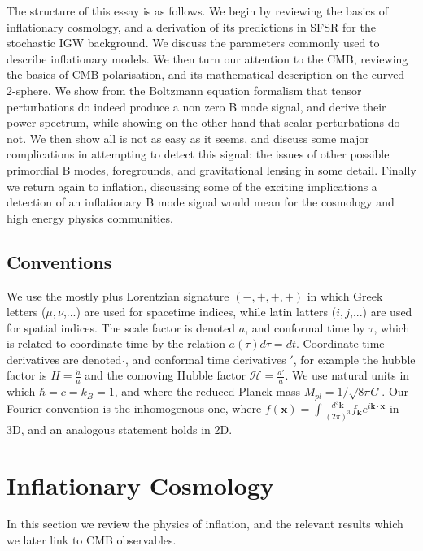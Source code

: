 \documentclass[a4paper,10pt]{article}
\renewcommand{\v}[1]{\mathbf{#1}}
\newcommand{\Mp}{M_{pl}}
\newcommand{\fint}[1]{\int \frac{d^3 \v{#1}}{(2\pi)^3}}
\begin{document}
The structure of this essay is as follows. We begin by reviewing the basics of inflationary cosmology, and a derivation of its predictions in SFSR for the stochastic IGW background. We discuss the parameters commonly used to describe inflationary models. We then turn our attention to the CMB, reviewing the basics of CMB polarisation, and its mathematical description on the curved 2-sphere. We show from the Boltzmann equation formalism that tensor perturbations do indeed produce a non zero B mode signal, and derive their power spectrum, while showing on the other hand that scalar perturbations do not. We then show all is not as easy as it seems, and discuss some major complications in attempting to detect this signal: the issues of other possible primordial B modes, foregrounds, and gravitational lensing in some detail. Finally we return again to inflation, discussing some of the exciting implications a detection of an inflationary B mode signal would mean for the cosmology and high energy physics communities. 

\subsection{Conventions}

We use the mostly plus Lorentzian signature $(-,+,+,+)$ in which Greek letters ($\mu,\nu$,...) are used for spacetime indices, while latin latters ($i,j$,...) are used for spatial indices. The scale factor is denoted $a$, and conformal time by $\tau$, which is related to coordinate time by the relation $a(\tau)d\tau = dt$. Coordinate time derivatives are denoted $\dot{}$, and conformal time derivatives $'$, for example the hubble factor is $H=\frac{\dot{a}}{a}$ and the comoving Hubble factor $\mathcal{H}=\frac{a'}{a}$. We use natural units in which $\hbar=c=k_B=1$, and where the reduced Planck mass $\Mp = 1/\sqrt{8\pi G}$. Our Fourier convention is the inhomogenous one, where $f(\v{x}) = \fint{k} f_\v{k}e^{i\v{k}\cdot\v{x}}$ in 3D, and an analogous statement holds in 2D.


\newpage
\section{Inflationary Cosmology}

In this section we review the physics of inflation, and the relevant results which we later link to CMB observables.
\end{document}

